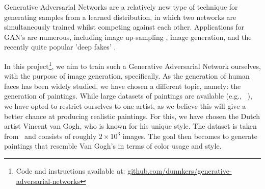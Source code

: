 \documentclass{article}
\begin{document}

Generative Adversarial Networks are a relatively new type of technique for generating samples from a learned distribution, in which two networks are simultaneously trained whilst competing against each other. Applications for GAN's are numerous, including image up-sampling \cite{wang2018esrgan}, image generation, and the recently quite popular 'deep fakes' \cite{marra2018detection}.


In this project\footnote{Code and instructions available at: \href{https://github.com/dunnkers/generative-adversarial-networks}{github.com/dunnkers/generative-adversarial-networks}}, we aim to train such a Generative Adversarial Network ourselves, with the purpose of image generation, specifically. As the generation of human faces has been widely studied, we have chosen a different topic, namely: the generation of paintings. While large datasets of paintings are available (e.g., ~\cite{kaggle_rijksmuseum}), we have opted to restrict ourselves to one artist, as we believe this will give a better chance at producing realistic paintings. For this, we have chosen the Dutch artist Vincent van Gogh, who is known for his unique style. The dataset is taken from~\cite{kaggle_van_gogh} and consists of roughly $2 \times 10^3$ images. The goal then becomes to generate paintings that resemble Van Gogh's in terms of color usage and style.\\
\end{document}
